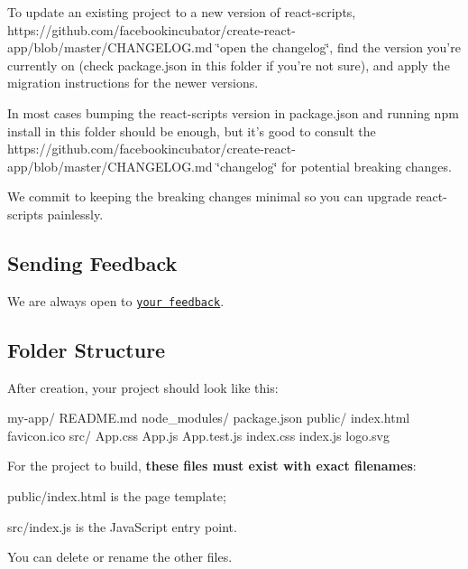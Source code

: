 To update an existing project to a new version of {\ttfamily react-\/scripts}, https\+://github.com/facebookincubator/create-\/react-\/app/blob/master/\+C\+H\+A\+N\+G\+E\+L\+O\+G.\+md \char`\"{}open the changelog\char`\"{}, find the version you’re currently on (check {\ttfamily package.\+json} in this folder if you’re not sure), and apply the migration instructions for the newer versions.

In most cases bumping the {\ttfamily react-\/scripts} version in {\ttfamily package.\+json} and running {\ttfamily npm install} in this folder should be enough, but it’s good to consult the https\+://github.com/facebookincubator/create-\/react-\/app/blob/master/\+C\+H\+A\+N\+G\+E\+L\+O\+G.\+md \char`\"{}changelog\char`\"{} for potential breaking changes.

We commit to keeping the breaking changes minimal so you can upgrade {\ttfamily react-\/scripts} painlessly.

\subsection*{Sending Feedback}

We are always open to \href{https://github.com/facebookincubator/create-react-app/issues}{\tt your feedback}.

\subsection*{Folder Structure}

After creation, your project should look like this\+:


\begin{DoxyCode}
my-app/
  README.md
  node\_modules/
  package.json
  public/
    index.html
    favicon.ico
  src/
    App.css
    App.js
    App.test.js
    index.css
    index.js
    logo.svg
\end{DoxyCode}


For the project to build, {\bfseries these files must exist with exact filenames}\+:


\begin{DoxyItemize}
\item {\ttfamily public/index.\+html} is the page template;
\item {\ttfamily src/index.\+js} is the Java\+Script entry point.
\end{DoxyItemize}

You can delete or rename the other files.

